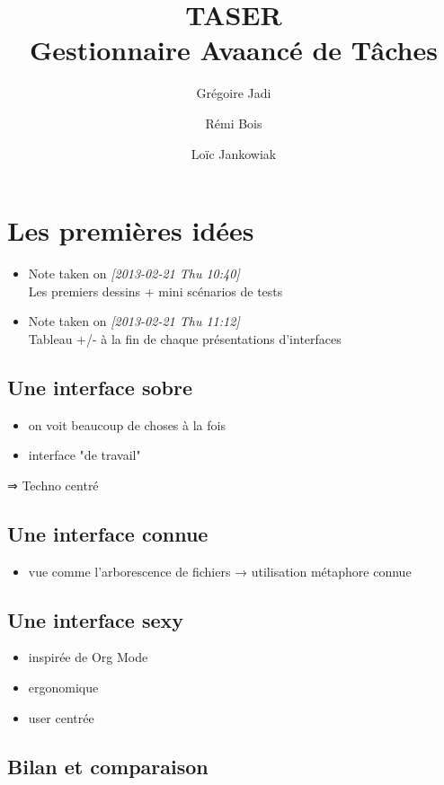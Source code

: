 \documentclass[11pt]{article}
\author{Grégoire Jadi \and{} Rémi Bois \and{} Loïc Jankowiak}
\title{TASER \\
Gestionnaire Avaancé de Tâches}
\begin{document}
\maketitle
\tableofcontents


\section{Les premières idées}
\begin{itemize}
\item Note taken on \textit{[2013-02-21 Thu 10:40]} \\
  Les premiers dessins + mini scénarios de tests
\item Note taken on \textit{[2013-02-21 Thu 11:12]} \\
  Tableau +/- à la fin de chaque présentations d'interfaces
\end{itemize}


\subsection{Une interface sobre}
\begin{itemize}
\item on voit beaucoup de choses à la fois
\item interface "de travail"
\end{itemize}

⇒ Techno centré


\subsection{Une interface connue}
\begin{itemize}
\item vue comme l'arborescence de fichiers
  → utilisation métaphore connue
\end{itemize}


\subsection{Une interface sexy}
\begin{itemize}
\item inspirée de Org Mode
\item ergonomique
\item user centrée
\end{itemize}


\subsection{Bilan et comparaison}
\end{document}
